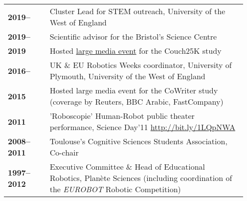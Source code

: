 \begin{tabular}{p{0.17\linewidth}p{0.8\linewidth}}

    \bf 2019--& Cluster Lead for STEM outreach, University of the West of England \\
    \bf 2019--& Scientific advisor for the Bristol's Science Centre \\
    \bf 2019 & Hosted \href{https://share.coveragebook.com/b/6d7defc7c4a49e93}{large media event} for the Couch25K study~\cite{winkle2020insitu} \\
    \bf 2016--& UK \& EU Robotics Weeks coordinator, University of Plymouth, University of the West of England \\
    \bf 2015 & Hosted large media event for the CoWriter study~\cite{lemaignan2016learning} (coverage by Reuters, BBC Arabic, FastCompany) \\
    \bf 2011& 'Roboscopie' Human-Robot public theater performance, Science Day'11 \url{http://bit.ly/1LQpNWA} \\
    \bf 2008--2011& Toulouse's Cognitive Sciences Students Association, Co-chair \\
    \bf 1997--2012& Executive Committee \& Head of Educational Robotics, Planète Sciences (including coordination of the \textit{EUROBOT} Robotic Competition) \\

\end{tabular}
\vspace{2em}







